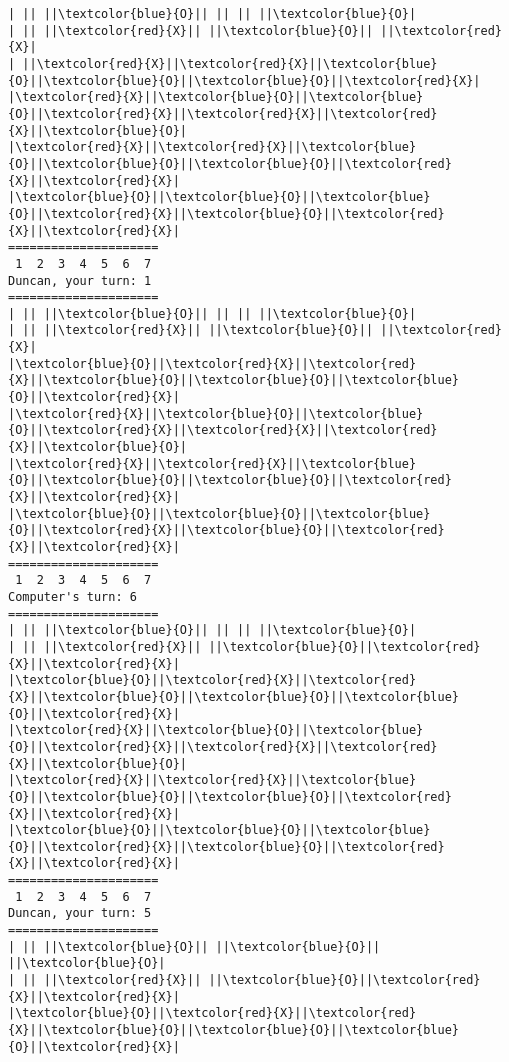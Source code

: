\documentclass{article}
\begin{document}
\begin{Verbatim}[commandchars=\\\{\}]
| || ||\textcolor{blue}{O}|| || || ||\textcolor{blue}{O}|
| || ||\textcolor{red}{X}|| ||\textcolor{blue}{O}|| ||\textcolor{red}{X}|
| ||\textcolor{red}{X}||\textcolor{red}{X}||\textcolor{blue}{O}||\textcolor{blue}{O}||\textcolor{blue}{O}||\textcolor{red}{X}|
|\textcolor{red}{X}||\textcolor{blue}{O}||\textcolor{blue}{O}||\textcolor{red}{X}||\textcolor{red}{X}||\textcolor{red}{X}||\textcolor{blue}{O}|
|\textcolor{red}{X}||\textcolor{red}{X}||\textcolor{blue}{O}||\textcolor{blue}{O}||\textcolor{blue}{O}||\textcolor{red}{X}||\textcolor{red}{X}|
|\textcolor{blue}{O}||\textcolor{blue}{O}||\textcolor{blue}{O}||\textcolor{red}{X}||\textcolor{blue}{O}||\textcolor{red}{X}||\textcolor{red}{X}|
=====================
 1  2  3  4  5  6  7
Duncan, your turn: 1
=====================
| || ||\textcolor{blue}{O}|| || || ||\textcolor{blue}{O}|
| || ||\textcolor{red}{X}|| ||\textcolor{blue}{O}|| ||\textcolor{red}{X}|
|\textcolor{blue}{O}||\textcolor{red}{X}||\textcolor{red}{X}||\textcolor{blue}{O}||\textcolor{blue}{O}||\textcolor{blue}{O}||\textcolor{red}{X}|
|\textcolor{red}{X}||\textcolor{blue}{O}||\textcolor{blue}{O}||\textcolor{red}{X}||\textcolor{red}{X}||\textcolor{red}{X}||\textcolor{blue}{O}|
|\textcolor{red}{X}||\textcolor{red}{X}||\textcolor{blue}{O}||\textcolor{blue}{O}||\textcolor{blue}{O}||\textcolor{red}{X}||\textcolor{red}{X}|
|\textcolor{blue}{O}||\textcolor{blue}{O}||\textcolor{blue}{O}||\textcolor{red}{X}||\textcolor{blue}{O}||\textcolor{red}{X}||\textcolor{red}{X}|
=====================
 1  2  3  4  5  6  7
Computer's turn: 6
=====================
| || ||\textcolor{blue}{O}|| || || ||\textcolor{blue}{O}|
| || ||\textcolor{red}{X}|| ||\textcolor{blue}{O}||\textcolor{red}{X}||\textcolor{red}{X}|
|\textcolor{blue}{O}||\textcolor{red}{X}||\textcolor{red}{X}||\textcolor{blue}{O}||\textcolor{blue}{O}||\textcolor{blue}{O}||\textcolor{red}{X}|
|\textcolor{red}{X}||\textcolor{blue}{O}||\textcolor{blue}{O}||\textcolor{red}{X}||\textcolor{red}{X}||\textcolor{red}{X}||\textcolor{blue}{O}|
|\textcolor{red}{X}||\textcolor{red}{X}||\textcolor{blue}{O}||\textcolor{blue}{O}||\textcolor{blue}{O}||\textcolor{red}{X}||\textcolor{red}{X}|
|\textcolor{blue}{O}||\textcolor{blue}{O}||\textcolor{blue}{O}||\textcolor{red}{X}||\textcolor{blue}{O}||\textcolor{red}{X}||\textcolor{red}{X}|
=====================
 1  2  3  4  5  6  7
Duncan, your turn: 5
=====================
| || ||\textcolor{blue}{O}|| ||\textcolor{blue}{O}|| ||\textcolor{blue}{O}|
| || ||\textcolor{red}{X}|| ||\textcolor{blue}{O}||\textcolor{red}{X}||\textcolor{red}{X}|
|\textcolor{blue}{O}||\textcolor{red}{X}||\textcolor{red}{X}||\textcolor{blue}{O}||\textcolor{blue}{O}||\textcolor{blue}{O}||\textcolor{red}{X}|

\end{Verbatim}
\end{document}
